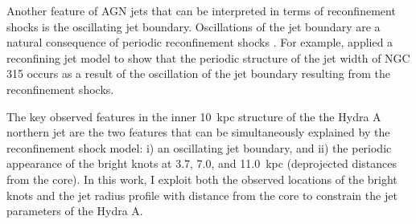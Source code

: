Another feature of AGN jets that can be interpreted in terms of reconfinement shocks is the oscillating jet boundary. Oscillations of the jet boundary are a natural consequence of periodic reconfinement shocks \citep{prandtl1907}. For example, \citet{sanders83} applied a reconfining jet model to show that the periodic structure of the jet width of NGC 315 occurs as a result of the oscillation of the jet boundary resulting from the reconfinement shocks.

The key observed features in the inner 10~kpc structure of the the Hydra A northern jet are the two features that can be simultaneously explained by the reconfinement shock model: i) an oscillating jet boundary, and ii) the periodic appearance of the bright knots at 3.7, 7.0, and 11.0~kpc (deprojected distances from the core). In this work, I exploit both the observed locations of the bright knots and the jet radius profile with distance from the core to constrain the jet parameters of  the Hydra A. 












